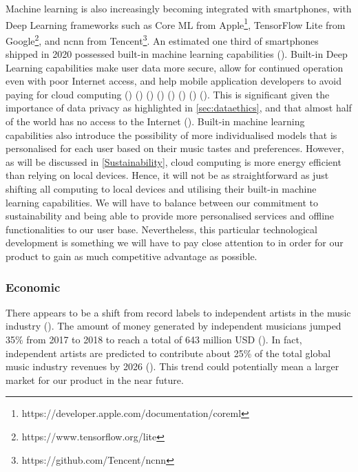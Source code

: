 Machine learning is also increasingly becoming integrated with smartphones, with Deep Learning frameworks such as Core ML from Apple\footnote{https://developer.apple.com/documentation/coreml}, TensorFlow Lite from Google\footnote{https://www.tensorflow.org/lite}, and ncnn from Tencent\footnote{https://github.com/Tencent/ncnn}.
An estimated one third of smartphones shipped in 2020 possessed built-in machine learning capabilities (\cite{counterpointML}). 
Built-in Deep Learning capabilities make user data more secure, allow for continued operation even with poor Internet access, and help mobile application developers to avoid paying for cloud computing (\cite{10.1145/2644865.2541967}) (\cite{https://doi.org/10.48550/arxiv.1704.04861}) (\cite{DL3}) (\cite{7460664}) (\cite{10.1145/2750858.2804262}) (\cite{10.1145/3210240.3210337}) (\cite{10.1145/3241539.3241563}) (\cite{10.1145/3005448}). This is significant given the importance of data privacy as highlighted in \cref{sec:dataethics}, and that almost half of the world has no access to the Internet (\cite{cisco_2022}). Built-in machine learning capabilities also introduce the possibility of more individualised models that is personalised for each user based on their music tastes and preferences. However, as will be discussed in \cref{Sustainability}, cloud computing is more energy efficient than relying on local devices. Hence, it will not be as straightforward as just shifting all computing to local devices and utilising their built-in machine learning capabilities. We will have to balance between our commitment to sustainability and being able to provide more personalised services and offline functionalities to our user base. Nevertheless, this particular technological development is something we will have to pay close attention to in order for our product to gain as much competitive advantage as possible.

\subsubsection{Economic}
There appears to be a shift from record labels to independent artists in the music industry (\cite{worldwide2020}). The amount of money generated by independent musicians jumped 35\% from 2017 to 2018 to reach a total of 643 million USD (\cite{independentartists}). In fact, independent artists are predicted to contribute about 25\% of the total global music industry revenues by 2026 (\cite{rollingstone}). This trend could potentially mean a larger market for our product in the near future.

